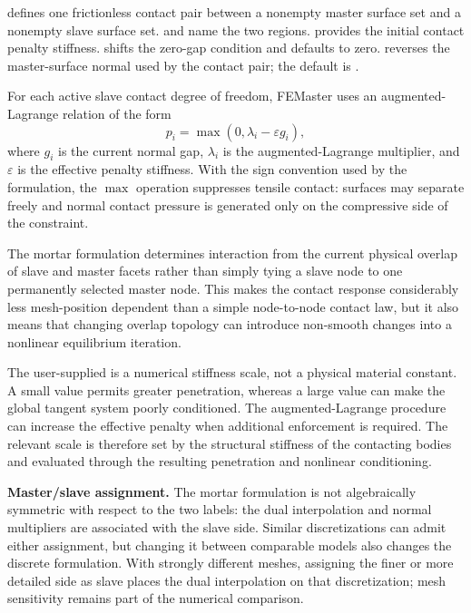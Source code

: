 
 defines one frictionless contact pair between a nonempty master surface set and a nonempty slave surface set.  and  name the two regions.  provides the initial contact penalty stiffness.  shifts the zero-gap condition and defaults to zero.  reverses the master-surface normal used by the contact pair; the default is .

For each active slave contact degree of freedom, FEMaster uses an augmented-Lagrange relation of the form
\[
p_i=\max\left(0,\lambda_i-\varepsilon g_i\right),
\]
where \(g_i\) is the current normal gap, \(\lambda_i\) is the augmented-Lagrange multiplier, and \(\varepsilon\) is the effective penalty stiffness. With the sign convention used by the formulation, the \(\max\) operation suppresses tensile contact: surfaces may separate freely and normal contact pressure is generated only on the compressive side of the constraint.

The mortar formulation determines interaction from the current physical overlap of slave and master facets rather than simply tying a slave node to one permanently selected master node. This makes the contact response considerably less mesh-position dependent than a simple node-to-node contact law, but it also means that changing overlap topology can introduce non-smooth changes into a nonlinear equilibrium iteration.

The user-supplied  is a numerical stiffness scale, not a physical material constant. A small value permits greater penetration, whereas a large value can make the global tangent system poorly conditioned. The augmented-Lagrange procedure can increase the effective penalty when additional enforcement is required. The relevant scale is therefore set by the structural stiffness of the contacting bodies and evaluated through the resulting penetration and nonlinear conditioning.

\textbf{Master/slave assignment.} The mortar formulation is not algebraically symmetric with respect to the two labels: the dual interpolation and normal multipliers are associated with the slave side. Similar discretizations can admit either assignment, but changing it between comparable models also changes the discrete formulation. With strongly different meshes, assigning the finer or more detailed side as slave places the dual interpolation on that discretization; mesh sensitivity remains part of the numerical comparison.

